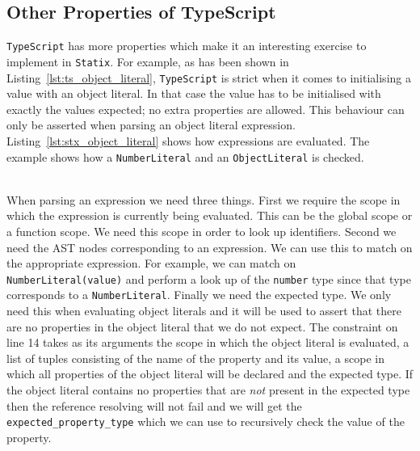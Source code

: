 \documentclass{article}
\newcommand{\ttt}[1]{\texttt{#1}}
\begin{document}
\subsection{Other Properties of TypeScript}
\ttt{TypeScript} has more properties which make it an interesting exercise to implement in \ttt{Statix}.
For example, as has been shown in Listing~\ref{lst:ts_object_literal}, \ttt{TypeScript} is strict when it comes to initialising a value with an object literal.
In that case the value has to be initialised with exactly the values expected; no extra properties are allowed.
This behaviour can only be asserted when parsing an object literal expression.
Listing~\ref{lst:stx_object_literal} shows how expressions are evaluated.
The example shows how a \ttt{NumberLiteral} and an \ttt{ObjectLiteral} is checked.
\\\\
\noindent\hrulefill\par
\noindent{}
When parsing an expression we need three things.
First we require the scope in which the expression is currently being evaluated.
This can be the global scope or a function scope.
We need this scope in order to look up identifiers.
Second we need the AST nodes corresponding to an expression.
We can use this to match on the appropriate expression.
For example, we can match on \ttt{NumberLiteral(value)} and perform a look up of the \ttt{number} type since that type corresponds to a \ttt{NumberLiteral}.
Finally we need the expected type.
We only need this when evaluating object literals and it will be used to assert that there are no properties in the object literal that we do not expect.
The constraint on line 14 takes as its arguments the scope in which the object literal is evaluated, a list of tuples consisting of the name of the property and its value, a scope in which all properties of the object literal will be declared and the expected type.
If the object literal contains no properties that are \textit{not} present in the expected type then the reference resolving will not fail and we will get the \ttt{expected\_property\_type} which we can use to recursively check the value of the property.
\end{document}
